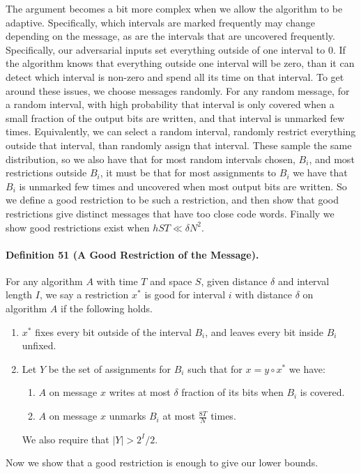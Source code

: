 The argument becomes a bit more complex when we allow the algorithm to be adaptive. Specifically, which intervals are marked frequently may change depending on the message, as are the intervals that are uncovered frequently. Specifically, our adversarial inputs set everything outside of one interval to 0. If the algorithm knows that everything outside one interval will be zero, than it can detect which interval is non-zero and spend all its time on that interval.
To get around these issues, we choose messages randomly. For any random message, for a random interval, with high probability that interval is only covered when a small fraction of the output bits are written, and that interval is unmarked few times. Equivalently, we can select a random interval, randomly restrict everything outside that interval, than randomly assign that interval. These sample the same distribution, so we also have that for most random intervals chosen, $B_i$, and most restrictions outside $B_i$, it must be that for most assignments to $B_i$ we have that $B_i$ is unmarked few times and uncovered when most output bits are written.
So we define a good restriction to be such a restriction, and then show that good restrictions give distinct messages that have too close code words. Finally we show good restrictions exist when $hST\ll\delta N^2$.
\paragraph{Definition 51 (A Good Restriction of the Message).} For any algorithm $A$ with time $T$ and space $S$, given distance $\delta$ and interval length $I$, we say a restriction $x^*$ is good for interval $i$ with distance $\delta$ on algorithm $A$ if the following holds.
\begin{enumerate}
\item $x^*$ fixes every bit outside of the interval $B_i$, and leaves every bit inside $B_i$ unfixed.
\item Let $Y$ be the set of assignments for $B_i$ such that for $x=y\circ x^*$ we have:
\begin{enumerate}\item $A$ on message $x$ writes at most $\delta$ fraction of its bits when $B_i$ is covered.\item $A$ on message $x$ unmarks $B_i$ at most $\frac{8T}N$ times.\end{enumerate}
We also require that $|Y|>2^I/2$.
\end{enumerate}
Now we show that a good restriction is enough to give our lower bounds.
